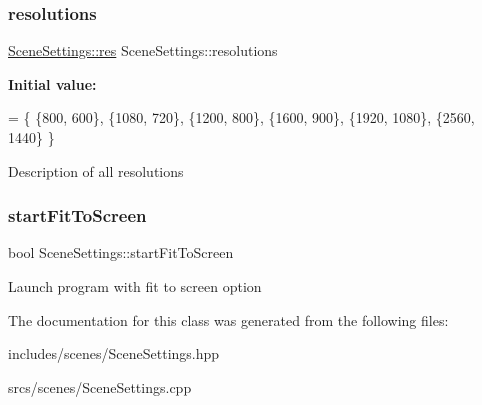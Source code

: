 \subsubsection{\texorpdfstring{resolutions}{resolutions}}
{\footnotesize\ttfamily \hyperlink{struct_scene_settings_1_1res}{Scene\+Settings\+::res} Scene\+Settings\+::resolutions\hspace{0.3cm}{\ttfamily [static]}}

{\bfseries Initial value\+:}
\begin{DoxyCode}
= \{
    \{800, 600\},
    \{1080, 720\},
    \{1200, 800\},
    \{1600, 900\},
    \{1920, 1080\},
    \{2560, 1440\}
\}
\end{DoxyCode}
Description of all resolutions \mbox{\label{class_scene_settings_a39e0fde5848e50be67df1669b83ae384}} 
\subsubsection{\texorpdfstring{start\+Fit\+To\+Screen}{startFitToScreen}}
{\footnotesize\ttfamily bool Scene\+Settings\+::start\+Fit\+To\+Screen}

Launch program with \textquotesingle{}fit to screen\textquotesingle{} option 

The documentation for this class was generated from the following files\+:\begin{DoxyCompactItemize}
\item 
includes/scenes/Scene\+Settings.\+hpp\item 
srcs/scenes/Scene\+Settings.\+cpp\end{DoxyCompactItemize}
